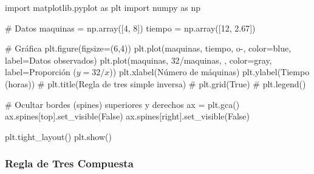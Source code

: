 \documentclass[
  stu,
  floatsintext,
  longtable,
  a4paper,
  nolmodern,
  notxfonts,
  notimes,
  12pt,
  colorlinks=true,linkcolor=blue,citecolor=blue,urlcolor=blue]{apa7}
\newenvironment{Shaded}{\begin{snugshade}}{\end{snugshade}}
\newcommand{\CommentTok}[1]{\textcolor[rgb]{0.37,0.37,0.37}{#1}}
\newcommand{\DecValTok}[1]{\textcolor[rgb]{0.68,0.00,0.00}{#1}}
\newcommand{\FloatTok}[1]{\textcolor[rgb]{0.68,0.00,0.00}{#1}}
\newcommand{\ImportTok}[1]{\textcolor[rgb]{0.00,0.46,0.62}{#1}}
\newcommand{\NormalTok}[1]{\textcolor[rgb]{0.00,0.23,0.31}{#1}}
\newcommand{\OperatorTok}[1]{\textcolor[rgb]{0.37,0.37,0.37}{#1}}
\newcommand{\StringTok}[1]{\textcolor[rgb]{0.13,0.47,0.30}{#1}}
\newcommand{\VariableTok}[1]{\textcolor[rgb]{0.07,0.07,0.07}{#1}}
\begin{document}
\begin{Shaded}
\begin{Highlighting}[]
\ImportTok{import}\NormalTok{ matplotlib.pyplot }\ImportTok{as}\NormalTok{ plt}
\ImportTok{import}\NormalTok{ numpy }\ImportTok{as}\NormalTok{ np}

\CommentTok{\# Datos}
\NormalTok{maquinas }\OperatorTok{=}\NormalTok{ np.array([}\DecValTok{4}\NormalTok{, }\DecValTok{8}\NormalTok{])}
\NormalTok{tiempo }\OperatorTok{=}\NormalTok{ np.array([}\DecValTok{12}\NormalTok{, }\FloatTok{2.67}\NormalTok{])}

\CommentTok{\# Gráfica}
\NormalTok{plt.figure(figsize}\OperatorTok{=}\NormalTok{(}\DecValTok{6}\NormalTok{,}\DecValTok{4}\NormalTok{))}
\NormalTok{plt.plot(maquinas, tiempo, }\StringTok{\textquotesingle{}o{-}\textquotesingle{}}\NormalTok{, color}\OperatorTok{=}\StringTok{\textquotesingle{}blue\textquotesingle{}}\NormalTok{, label}\OperatorTok{=}\StringTok{\textquotesingle{}Datos observados\textquotesingle{}}\NormalTok{)}
\NormalTok{plt.plot(maquinas, }\DecValTok{32}\OperatorTok{/}\NormalTok{maquinas, }\StringTok{\textquotesingle{}{-}{-}\textquotesingle{}}\NormalTok{, color}\OperatorTok{=}\StringTok{\textquotesingle{}gray\textquotesingle{}}\NormalTok{, label}\OperatorTok{=}\StringTok{\textquotesingle{}Proporción ($y = 32/x$)\textquotesingle{}}\NormalTok{)}
\NormalTok{plt.xlabel(}\StringTok{\textquotesingle{}Número de máquinas\textquotesingle{}}\NormalTok{)}
\NormalTok{plt.ylabel(}\StringTok{\textquotesingle{}Tiempo (horas)\textquotesingle{}}\NormalTok{)}
\CommentTok{\# plt.title(\textquotesingle{}Regla de tres simple inversa\textquotesingle{})}
\CommentTok{\# plt.grid(True)}
\CommentTok{\# plt.legend()}

\CommentTok{\# Ocultar bordes (spines) superiores y derechos}
\NormalTok{ax }\OperatorTok{=}\NormalTok{ plt.gca()}
\NormalTok{ax.spines[}\StringTok{\textquotesingle{}top\textquotesingle{}}\NormalTok{].set\_visible(}\VariableTok{False}\NormalTok{)}
\NormalTok{ax.spines[}\StringTok{\textquotesingle{}right\textquotesingle{}}\NormalTok{].set\_visible(}\VariableTok{False}\NormalTok{)}

\NormalTok{plt.tight\_layout()}
\NormalTok{plt.show()}
\end{Highlighting}
\end{Shaded}

\subsubsection{Regla de Tres Compuesta}\label{regla-de-tres-compuesta}
\end{document}
